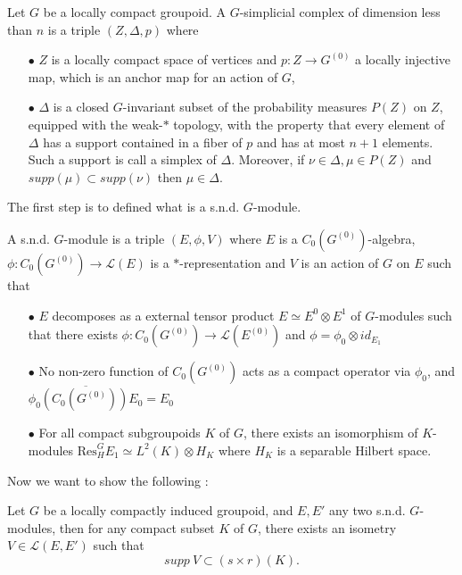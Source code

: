 \begin{definition}
Let $G$ be a locally compact groupoid. A $G$-simplicial complex of dimension less than $n$ is a triple $(Z,\Delta, p)$ where
\begin{itemize}
\item[$\bullet$] $Z$ is a locally compact space of vertices and $p: Z \rightarrow G^{(0)}$ a locally injective map, which is an anchor map for an action of $G$, 
\item[$\bullet$] $\Delta$ is a closed $G$-invariant subset of the probability measures $P(Z)$ on $Z$, equipped with the weak-$*$ topology, with the property that every element of $\Delta$ has a support contained in a fiber of $p$ and has at most $n+1$ elements. Such a support is call a simplex of $\Delta$. Moreover, if $\nu\in \Delta,\mu \in P(Z)$ and $supp(\mu)\subset supp(\nu)$ then $\mu\in \Delta$.
\end{itemize}
\end{definition}

The first step is to defined what is a s.n.d. $G$-module.

\begin{definition}
A s.n.d. $G$-module is a triple $(E,\phi,V)$ where $E$ is a $C_0(G^{(0)})$-algebra, $\phi : C_0(G^{(0)})\rightarrow \mathcal L(E)$ is a $*$-representation and $V$ is an action of $G$ on $E$ such that
\begin{itemize}
\item[$\bullet$] $E$ decomposes as a external tensor product $E\simeq E^0\otimes E^1$ of $G$-modules such that there exists $\phi : C_0(G^{(0)})\rightarrow \mathcal L(E^{(0)})$ and $\phi= \phi_0\otimes id_{E_1}$
\item[$\bullet$] No non-zero function of $C_0(G^{(0)})$ acts as a compact operator via $\phi_0$, and $\overline{\phi_0(C_0(G^{(0)}))E_0 }= E_0$
\item[$\bullet$] For all compact subgroupoids $K$ of $G$, there exists an isomorphism of $K$-modules $\text{Res}_H^G E_1 \simeq L^2(K)\otimes H_K$ where $H_K$ is a separable Hilbert space.
\end{itemize}
\end{definition}

Now we want to show the following :

\begin{lem}
Let $G$ be a locally compactly induced groupoid, and $E,E'$ any two s.n.d. $G$-modules, then for any compact subset $K$ of $G$, there exists an isometry $V\in \mathcal L(E,E')$ such that 
\[supp\ V \subset (s\times r)(K). \]
\end{lem}



























 


